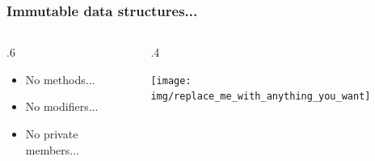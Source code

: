 \documentclass[17pt]{beamer}
\renewcommand{\(}[1]{\begin{columns}[#1]}
\renewcommand{\)}{\end{columns}}
\newcommand{\<}[1]{\begin{column}{#1}}
\renewcommand{\>}{\end{column}}
\begin{document}
\begin{frame}
\frametitle{Immutable data structures...}
\({c}
\<{.6\textwidth}
\begin{center}
  \begin{itemize}
  \item<2-> No methods...
  \item<3-> No modifiers...
  \item<4-> No private members...
  \end{itemize}
\end{center}
\>
\<{.4\textwidth}
\begin{center}
  \texttt{[image: img/replace\_me\_with\_anything\_you\_want]}
\end{center}
\>
\)
\end{frame}
\end{document}
